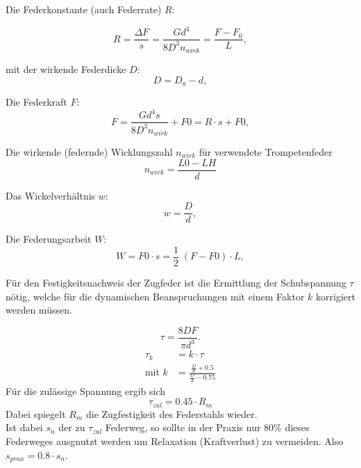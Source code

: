 Die Federkonstante (auch Federrate) $R$:

\begin{equation}
    R=\frac{\Delta F}{s}=\frac{Gd^4}{8D^3n_{wirk}}=\frac{F-F_0}{L},
    \label{eqn:federrate}
\end{equation}

mit der wirkende Federdicke $D$:
\begin{equation}
    D=D_a-d,
\end{equation}

Die Federkraft $F$:
\begin{equation}
    F=\frac{Gd^4s}{8D^3n_{wirk}}+F0=R \cdot s +F0,
    \label{eqn:federkraft}
\end{equation}

Die wirkende (federnde) Wicklungszahl $n_{wirk}$ für verwendete Trompetenfeder
\begin{equation}
    n_{wirk}=\frac{L0-LH}{d}    
\end{equation}

Das Wickelverhältnis $w$:
\begin{equation}
    w=\frac{D}{d},
\end{equation}

Die Federungsarbeit $W$:
\begin{equation}
    W=F0 \cdot s = \frac{1}{2}\;(F-F0) \cdot L,
    \label{eqn:federungsarbeit}
\end{equation}
\newline




Für den Festigkeitsnachweis der Zugfeder ist die Ermittlung der Schubspannung $\tau$
nötig, welche für die dynamischen Beanspruchungen mit einem Faktor $k$ korrigiert werden müssen.

\begin{equation}
    \tau = \frac{8DF}{\pi d^3}.
    \label{eqn:schubspannung}
\end{equation}
\begin{align}
    \tau_k &= k \cdot \tau\\
    \text{mit }k&=\frac{\frac{D}{d}+0.5}{\frac{D}{d}-0.75}
\end{align}
Für die zulässige Spannung ergib sich
\begin{equation}
    \tau_{zul}=0.45 \cdot R_m
\end{equation}
Dabei spiegelt $R_m$ die Zugfestigkeit des Federstahls wieder.\\
Ist dabei $s_n$ der zu $\tau_{zul}$ Federweg, so sollte in der Praxis nur 80\% dieses
Federweges ausgnutzt werden um Relaxation (Kraftverlust) zu vermeiden.
Also $s_{prax}=0.8 \cdot s_n$.  


